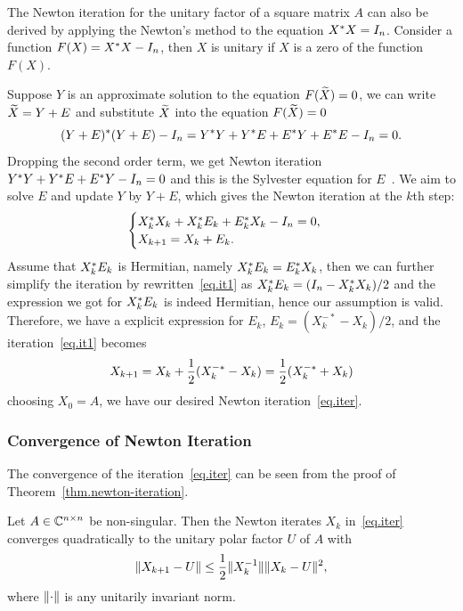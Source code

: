 The Newton iteration for the unitary factor of a square matrix $A$ can also be derived by applying the Newton's method to the equation $X^* X = I_n$. Consider a function $F(X) = X^* X - I_n$, then $X$ is unitary if $X$ is a zero of the function $F(X)$. 

Suppose $Y$ is an approximate solution to the equation $F(\widetilde X) = 0$, we can write $\widetilde X = Y + E$ and substitute $\widetilde X$ into the equation $F(\widetilde X) = 0$
\begin{equation}\notag
    (Y+E)^* (Y+E) - I_n = Y^* Y + Y^* E + E^* Y + E^* E - I_n = 0.
\end{equation}
Dropping the second order term, we get Newton iteration $Y^* Y + Y^* E + E^* Y - I_n = 0$ and this is the Sylvester equation for $E$~. We aim to solve $E$ and update $Y$ by $Y + E$, which gives the Newton iteration at the $k$th step:
\begin{equation}\label{eq.it1}
    \begin{cases}
        X_k ^* X_{k} + X_{k}^* E_k + E_k^* X_k - I_n = 0,\\
        X_{k+1} = X_{k} + E_k.
    \end{cases}
\end{equation}
Assume that $X_k^* E_k$ is Hermitian, namely $X_k^* E_k = E_k^* X_k$, then we can further simplify the iteration by rewritten~\eqref{eq.it1} as $X_k^* E_k = (I_n - X_k^* X_k)/2$ and the expression we got for $X_k^* E_k$ is indeed Hermitian, hence our assumption is valid. Therefore, we have a explicit expression for $E_k$, $E_k = (X_k^{-*} - X_k)/2$, and the iteration~\eqref{eq.it1} becomes 
\begin{equation}\notag
    X_{k+1} = X_{k} + \frac 12 (X_k^{-*}-X_k) = \frac 12(X_k^{-*} + X_k)
\end{equation}
choosing $X_0 = A$, we have our desired Newton iteration~\eqref{eq.iter}.

\subsubsection{Convergence of Newton Iteration}

The convergence of the iteration~\eqref{eq.iter} can be seen from the proof of Theorem~\ref{thm.newton-iteration}.

\begin{theorem}
     \label{thm.conv.new}
    Let $A\in\mathbb{C}^{n\times n}$ be non-singular. Then the Newton iterates $X_k$ in~\eqref{eq.iter} converges quadratically to the unitary polar factor $U$ of $A$ with 
    \begin{equation}\notag
        \|{X_{k+1} - U}\| \leq \frac 12 \|{X_k^{-1}}\|\|{X_k - U}\|^2,
    \end{equation}
    where $\|{\cdot}\|$ is any unitarily invariant norm.
\end{theorem}

